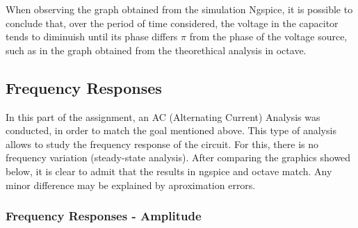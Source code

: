 When observing the graph obtained from the simulation  Ngspice, it is possible to conclude that, over the period of time considered, the voltage in the capacitor tends
to diminuish until its phase differs $\pi$ from the phase of the voltage source, such as in the graph obtained from the theorethical analysis in octave.

\subsection{Frequency Responses}

In this part of the assignment, an AC (Alternating Current) Analysis was conducted, in order to match the goal mentioned above. This type of analysis allows to study the frequency response of the circuit. For this, there is no frequency variation (steady-state analysis). After comparing the graphics showed below, it is clear to admit that the results in ngspice and octave match. Any minor difference may be explained by aproximation errors.

\subsubsection{Frequency Responses - Amplitude}


